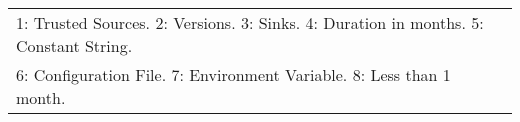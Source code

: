 \begin{table}[h]
{\begin{tabular}{l l l r r c r}
	\bottomrule 
	\multicolumn{7}{l}{1: Trusted Sources. 2: Versions. 3: Sinks. 4: Duration in months. 5: Constant String. }\\
	\multicolumn{7}{l}{ 6: Configuration File. 7: Environment Variable. 8: Less than 1 month.}
\end{tabular}
}
\end{table}
